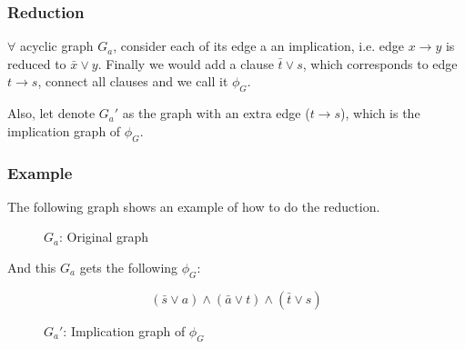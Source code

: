 \subsubsection*{Reduction}

$\forall$ acyclic graph $G_a$, consider each of its edge a an implication, i.e. edge $x \rightarrow y$ is reduced to $\bar{x} \vee y$.
Finally we would add a clause $\bar{t} \vee s$, which corresponds to edge $t \rightarrow s$, connect all clauses and we call it $\phi_G$.

Also, let denote $G_a'$ as the graph with an extra edge ($t \rightarrow s$), which is the implication graph of $\phi_G$.

\subsubsection*{Example}

The following graph shows an example of how to do the reduction.

\begin{figure}[h]
    \centering
    \caption{$G_a$: Original graph}
\end{figure}

And this $G_a$ gets the following $\phi_G$:

$$ (\bar{s} \vee a) \wedge (\bar{a} \vee t) \wedge (\bar{t} \vee s) $$

\begin{figure}[h]
    \centering
    \caption{$G_a'$: Implication graph of $\phi_G$}
\end{figure}


